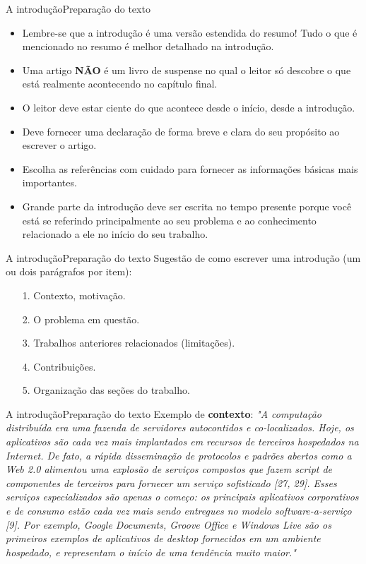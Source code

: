 \documentclass[t]{beamer}
\begin{document}

\begin{ftst}{A introdução}{Preparação do texto}
\justifying
\small
\begin{itemize}
    \item Lembre-se que a introdução é uma versão estendida do resumo! Tudo o que é mencionado no resumo é
    melhor detalhado na introdução.
    \item Uma artigo \textbf{NÃO} é um livro de suspense no qual o leitor só descobre o que está realmente acontecendo no capítulo final. 
    \item O leitor deve estar ciente do que acontece desde o início, desde a introdução.
    \item Deve fornecer uma declaração de forma breve e clara do seu propósito ao escrever o artigo.
    \item Escolha as referências com cuidado para fornecer as informações básicas mais importantes.
    \item Grande parte da introdução deve ser escrita no tempo presente porque você está se referindo principalmente ao seu problema e ao conhecimento relacionado a ele no início do seu trabalho.
    
\end{itemize}
\end{ftst}


\begin{ftst}{A introdução}{Preparação do texto}
\justifying
Sugestão de como escrever uma introdução (um ou dois parágrafos por item):
\small
\vone
\begin{itemize}
    \item[1.] Contexto, motivação.
    \item[2.] O problema em questão.
    \item[3.] Trabalhos anteriores relacionados (limitações).
    \item[4.] Contribuições.
    \item[5.] Organização das seções do trabalho.
\end{itemize}
\end{ftst}


\begin{ftst}{A introdução}{Preparação do texto}
\justifying
Exemplo de \textbf{contexto}:
\small
\vone
\textit{"A computação distribuída era uma fazenda de servidores autocontidos e co-localizados. Hoje, os aplicativos são cada vez mais implantados em recursos de terceiros hospedados na Internet. De fato, a rápida disseminação de protocolos e padrões abertos como a Web 2.0 alimentou uma explosão de serviços compostos que fazem script de componentes de terceiros para fornecer um serviço sofisticado [27, 29]. Esses serviços especializados são apenas o começo: os principais aplicativos corporativos e de consumo estão cada vez mais sendo entregues no modelo software-a-serviço [9]. Por exemplo, Google Documents, Groove Office e Windows Live são os primeiros exemplos de aplicativos de desktop fornecidos em um ambiente hospedado, e representam o início de uma tendência muito maior."}
\end{ftst}
\end{document}
